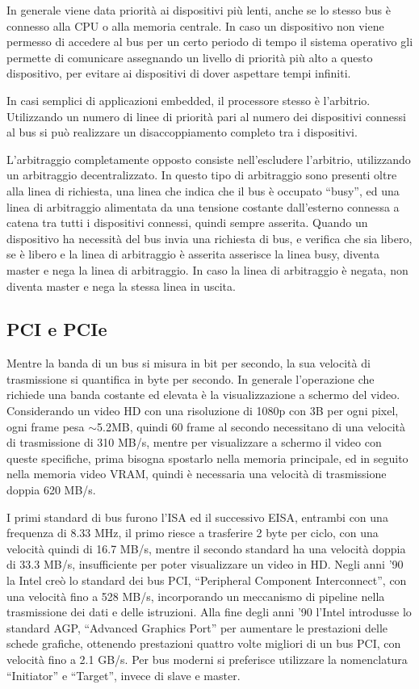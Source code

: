 \documentclass{article}
\numberwithin{equation}{subsection}
\begin{document}
In generale viene data priorità ai dispositivi più lenti, anche se lo stesso bus è connesso alla CPU o alla memoria centrale. In caso un dispositivo non viene permesso di 
accedere al bus per un certo periodo di tempo il sistema operativo gli permette di comunicare assegnando un livello di priorità più alto a questo dispositivo, per evitare ai dispositivi 
di dover aspettare tempi infiniti. 

In casi semplici di applicazioni embedded, il processore stesso è l'arbitrio. Utilizzando un numero di linee di priorità pari al numero dei dispositivi connessi al bus si può 
realizzare un disaccoppiamento completo tra i dispositivi. 

L'arbitraggio completamente opposto consiste nell'escludere l'arbitrio, utilizzando un arbitraggio decentralizzato. In questo tipo di arbitraggio sono presenti oltre alla linea 
di richiesta, una linea che indica che il bus è occupato ``busy'', ed una linea di arbitraggio alimentata da una tensione costante dall'esterno connessa a catena tra tutti i 
dispositivi connessi, quindi sempre asserita. Quando un dispositivo ha necessità del bus invia una richiesta di bus, e verifica che sia libero, se è libero e la linea di arbitraggio è asserita 
asserisce la linea busy, diventa master e nega la linea di arbitraggio. In caso la linea di arbitraggio è negata, non diventa master e nega la stessa linea in uscita. 

\subsection{PCI e PCIe}

Mentre la banda di un bus si misura in bit per secondo, la sua velocità di trasmissione si quantifica in byte per secondo. In generale l'operazione che richiede una banda costante ed 
elevata è la visualizzazione a schermo del video. Considerando un video HD con una risoluzione di 1080p con 3B per ogni pixel, ogni frame pesa $\sim$5.2MB, quindi 60 frame al secondo 
necessitano di una velocità di trasmissione di 310 MB/s, mentre per visualizzare a schermo il video con queste specifiche, prima bisogna spostarlo nella memoria principale, ed in seguito 
nella memoria video VRAM, quindi è necessaria una velocità di trasmissione doppia 620 MB/s. 

I primi standard di bus furono l'ISA ed il successivo EISA, entrambi con una frequenza di 8.33 MHz, il primo riesce a trasferire 2 byte per ciclo, con una velocità quindi di 16.7 MB/s, mentre 
il secondo standard ha una velocità doppia di 33.3 MB/s, insufficiente per poter visualizzare un video in HD. 
Negli anni '90 la Intel creò lo standard dei bus PCI, ``Peripheral Component Interconnect'', con una velocità fino a 528 MB/s, incorporando un meccanismo di pipeline nella trasmissione 
dei dati e delle istruzioni. 
Alla fine degli anni '90 l'Intel introdusse lo standard AGP, ``Advanced Graphics Port'' per aumentare le prestazioni delle schede grafiche, ottenendo prestazioni quattro volte migliori di un 
bus PCI, con velocità fino a 2.1 GB/s. 
Per bus moderni si preferisce utilizzare la nomenclatura ``Initiator'' e ``Target'', invece di slave e master. 
\end{document}

